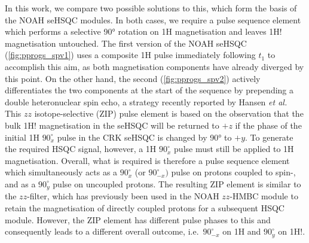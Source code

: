 \documentclass[11pt]{article}
\newcommand*{\proton}{1H}
\newcommand*{\magn}[1]{1H#1}
\newcommand*{\magnnot}[1]{1H!#1}
\begin{document}
\begin{refsection}
In this work, we compare two possible solutions to this, which form the basis of the NOAH seHSQC modules.
In both cases, we require a pulse sequence element which performs a selective \ang{90} rotation on \magn{} magnetisation and leaves \magnnot{} magnetisation untouched.
The first version of the NOAH seHSQC (\cref{fig:pprogs_spv1}) uses a composite \proton{} pulse immediately following $t_1$ to accomplish this aim, as both magnetisation components have already diverged by this point.
On the other hand, the second (\cref{fig:pprogs_spv2}) actively differentiates the two components at the start of the sequence by prepending a double heteronuclear spin echo, a strategy recently reported by Hansen \textit{et al.}\autocite{Hansen2021}
This $zz$ isotope-selective (ZIP) pulse element is based on the observation that the bulk \magnnot{} magnetisation in the seHSQC will be returned to $+z$ if the phase of the initial \proton{} $90^\circ_{x}$ pulse in the CRK seHSQC is changed by \ang{90} to $+y$.
To generate the required HSQC signal, however, a \proton{} $90^\circ_x$ pulse must still be applied to \magn{} magnetisation.
Overall, what is required is therefore a pulse sequence element which simultaneously acts as a $90^\circ_x$ (or $90^\circ_{-x})$ pulse on protons coupled to spin-, and as a $90^\circ_y$ pulse on uncoupled protons.
The resulting ZIP element is similar to the $zz$-filter, which has previously been used in the NOAH $zz$-HMBC module to retain the magnetisation of directly coupled protons for a subsequent HSQC module.\autocite{Kupce2018CC, Kupce2019JMR}
However, the ZIP element has different pulse phases to this and consequently leads to a different overall outcome, i.e.\ $90^\circ_{-x}$ on \magn{} and $90^\circ_y$ on \magnnot{}.


\end{refsection}
\end{document}
